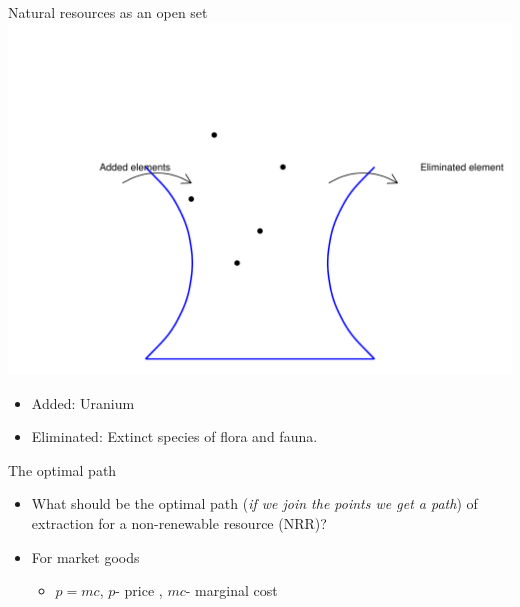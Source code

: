 \documentclass[
  ignorenonframetext,
]{beamer}
\providecommand{\tightlist}{%
  \setlength{\itemsep}{0pt}\setlength{\parskip}{0pt}}\usepackage{longtable,booktabs,array}
\begin{document}
\begin{frame}{Natural resources as an open set}
\label{natural-resources-as-an-open-set}
\includegraphics{intro_files/figure-beamer/unnamed-chunk-3-1.pdf}

\begin{itemize}
\tightlist
\item
  Added: Uranium
\item
  Eliminated: Extinct species of flora and fauna.
\end{itemize}
\end{frame}

\begin{frame}{The optimal path}
\label{the-optimal-path}
\begin{itemize}
\tightlist
\item
  What should be the optimal path (\emph{if we join the points we get a
  path}) of extraction for a non-renewable resource (NRR)?
\item
  For market goods

  \begin{itemize}
  \tightlist
  \item
    \(p = mc\), \(p\)- price , \(mc\)- marginal cost
  \end{itemize}
\end{itemize}
\end{frame}
\end{document}

